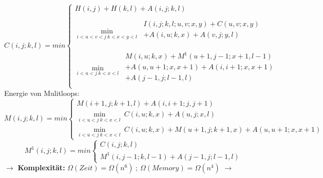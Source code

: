 \begin{equation}
C(i,j;k,l)= min 
\begin{cases} 
H(i,j) + H(k,l) + A(i,j;k,l) \\ 
\\					
\displaystyle\min_{i < u < v < j \ k<x<y<l}\ 
\begin{split}
I(i,j;k,l;u,v;x,y) + C(u,v;x,y)  \\
+ A(i,u;k,x) + A(v,j;y,l)\\ 
\end{split}
\\
\\
\displaystyle\min_{i<u<j \ k<x<l}\ 
\begin{split}
M(i,u;k,x) + M^{1}(u+1,j-1;x+1,l-1) \\ 
+ A(u,u+1;x,x+1) + A(i,i+1;x,x+1) \\ 
+ A(j-1,j;l-1,l)\\ 
\end{split}
\end{cases}
\end{equation}
Energie von Mulitloops:
\begin{equation}
M(i,j;k,l) = min
\begin{cases}
M(i+1,j;k+1,l) + A(i,i+1;j,j+1) \\
\displaystyle\min_{i<u<j \ k<x<l}\ C(i,u;k,x) + A(u,j;x,l) \\
\displaystyle\min_{i<u<j \ k<x<l}\ C(i,u;k,x) + M(u+1,j;k+1,x) + A(u,u+1;x,x+1) 
\end{cases}
\end{equation}
\begin{equation}
M^1(i,j;k,l) = min
\begin{cases}
C(i,j;k,l) \\
M^1(i,j-1;k,l-1) + A(j-1,j;l-1,l)
\end{cases}
\end{equation}
$\rightarrow$ \textbf{Komplexität:} $\Omega(Zeit) = \Omega(n^6) \ ; \ \Omega(Memory) = \Omega(n^4)$ $\rightarrow$

